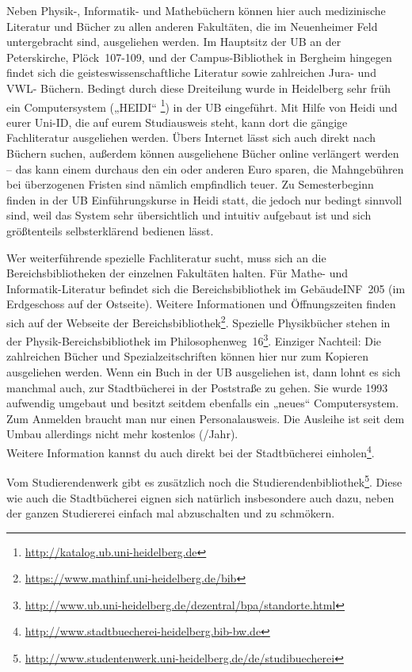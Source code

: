 Neben Physik-, Informatik- und Mathebüchern können hier auch medizinische Literatur und Bücher zu allen anderen Fakultäten, die im Neuenheimer Feld untergebracht sind, ausgeliehen werden. Im Hauptsitz der \gls{UB} an der Peterskirche, Plöck~107-109, und der Campus-Bibliothek in Bergheim hingegen findet sich die geisteswissenschaftliche Literatur sowie zahlreichen Jura- und VWL- Büchern. Bedingt durch diese Dreiteilung wurde in Heidelberg sehr früh ein Computersystem („\gls{HEIDI}“ \footnote{\url{http://katalog.ub.uni-heidelberg.de}}) in der UB eingeführt. Mit Hilfe von Heidi und eurer Uni-ID, die auf eurem Studiausweis steht, kann dort die gängige Fachliteratur ausgeliehen werden. Übers Internet lässt sich auch direkt nach Büchern suchen, außerdem können ausgeliehene Bücher online verlängert werden -- das kann einem durchaus den ein oder anderen Euro sparen, die Mahngebühren bei überzogenen Fristen sind nämlich empfindlich teuer. Zu Semesterbeginn finden in der UB Einführungskurse in Heidi statt, die jedoch nur bedingt sinnvoll sind, weil das System sehr übersichtlich und intuitiv aufgebaut ist und sich größtenteils selbsterklärend bedienen lässt.

Wer weiterführende spezielle Fachliteratur sucht, muss sich an die Bereichsbibliotheken der einzelnen Fakultäten halten. Für Mathe- und Informatik-Literatur befindet sich die Bereichsbibliothek im Gebäude\-\gls{INF}~205 (im Erdgeschoss auf der Ostseite). Weitere Informationen und Öffnungszeiten finden sich auf der Webseite der Bereichsbibliothek\footnote{\url{https://www.mathinf.uni-heidelberg.de/bib}}. Spezielle Physikbücher stehen in der Physik-Bereichsbibliothek im Philosophenweg~16\footnote{\url{http://www.ub.uni-heidelberg.de/dezentral/bpa/standorte.html}}. Einziger Nachteil: Die zahlreichen Bücher und Spezialzeitschriften können hier nur zum Kopieren ausgeliehen werden. Wenn ein Buch in der UB ausgeliehen ist, dann lohnt es sich manchmal auch, zur Stadtbücherei in der Poststraße zu gehen. Sie wurde 1993 aufwendig umgebaut und besitzt seitdem ebenfalls ein „neues“ Computersystem. Zum Anmelden braucht man nur einen Personalausweis. Die Ausleihe ist seit dem Umbau allerdings nicht mehr kostenlos (/Jahr).\\ Weitere Information kannst du auch direkt bei der Stadtbücherei einholen\footnote{\url{http://www.stadtbuecherei-heidelberg.bib-bw.de}}.

Vom Studierendenwerk gibt es zusätzlich noch die Studierendenbibliothek\footnote{\url{http://www.studentenwerk.uni-heidelberg.de/de/studibuecherei}}. Diese wie auch die Stadtbücherei eignen sich natürlich insbesondere auch dazu, neben der ganzen Studiererei einfach mal abzuschalten und zu schmökern.
